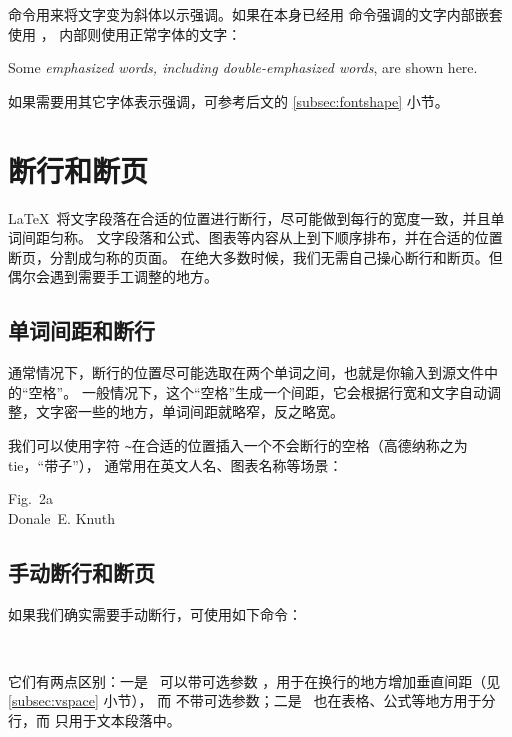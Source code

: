  命令用来将文字变为斜体以示强调。如果在本身已经用  命令强调的文字内部嵌套使用 ，
内部则使用正常字体的文字：
\begin{example}
Some \emph{emphasized words, 
including \emph{double-emphasized}
words}, are shown here.
\end{example}

如果需要用其它字体表示强调，可参考后文的 \ref{subsec:fontshape} 小节。

\section{断行和断页}\label{sec:break}

\LaTeX\ 将文字段落在合适的位置进行断行，尽可能做到每行的宽度一致，并且单词间距匀称。
文字段落和公式、图表等内容从上到下顺序排布，并在合适的位置断页，分割成匀称的页面。
在绝大多数时候，我们无需自己操心断行和断页。但偶尔会遇到需要手工调整的地方。

\subsection{单词间距和断行}\label{subsec:interword}

通常情况下，断行的位置尽可能选取在两个单词之间，也就是你输入到源文件中的“空格”。
一般情况下，这个“空格”生成一个间距，它会根据行宽和文字自动调整，文字密一些的地方，单词间距就略窄，反之略宽。

我们可以使用字符 \texttt\textasciitilde 在合适的位置插入一个不会断行的空格（高德纳称之为 tie，“带子”），
通常用在英文人名、图表名称等场景：
\begin{example}
Fig.~2a \\
Donale~E. Knuth
\end{example}

\subsection{手动断行和断页}\label{subsec:manual-break}

 
如果我们确实需要手动断行，可使用如下命令：
\begin{command}
\crcmd {} \\
\end{command}

它们有两点区别：一是 \crcmd\ 可以带可选参数 ，用于在换行的地方增加垂直间距（见 \ref{subsec:vspace} 小节），
而  不带可选参数；二是 \crcmd\ 也在表格、公式等地方用于分行，而  只用于文本段落中。

